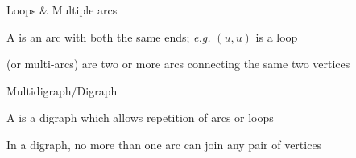 \documentclass[aspectratio=169]{beamer}\usepackage[]{graphicx}\usepackage[]{xcolor}
\begin{document}



\begin{frame}{Loops \& Multiple arcs}
	\begin{definition}[{Loop}]
	A  is an arc with both the same ends; \emph{e.g.} $(u,u)$ is a loop
\end{definition}
\vfill
	\begin{definition}
	 (or multi-arcs) are two or more arcs connecting the same two vertices
	\end{definition}
\end{frame}
\begin{frame}{Multidigraph/Digraph}
	\begin{definition}[{Multidigraph}]
	A  is a digraph which allows repetition of arcs or loops
	\end{definition}
	\vfill
	\begin{definition}[{Digraph}]
	In a digraph, no more than one arc can join any pair of vertices
\end{definition}
\end{frame}
\end{document}
